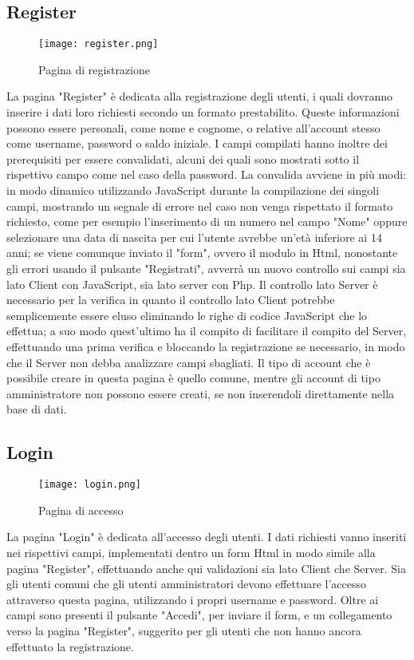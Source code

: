 \documentclass[binding=0.6cm, oneside, noexaminfo, italian]{sapthesis}
\begin{document}
\subsection{Register}
\begin{figure}[h]
    \centering
    \texttt{[image: register.png]}
    \caption{Pagina di registrazione}
    \label{fig:register}
\end{figure}
La pagina "Register" è dedicata alla registrazione degli utenti, i quali dovranno inserire i dati loro richiesti secondo un formato prestabilito. Queste informazioni possono essere personali, come nome e cognome, o relative all'account stesso come username, password o saldo iniziale. I campi compilati hanno inoltre dei prerequisiti per essere convalidati, alcuni dei quali sono mostrati sotto il rispettivo campo come nel caso della password. La convalida avviene in più modi: in modo dinamico utilizzando JavaScript durante la compilazione dei singoli campi, mostrando un segnale di errore nel caso non venga rispettato il formato richiesto, come per esempio l'inserimento di un numero nel campo "Nome" oppure selezionare una data di nascita per cui l'utente avrebbe un'età inferiore ai 14 anni; se viene comunque inviato il "form", ovvero il modulo in Html, nonostante gli errori usando il pulsante "Registrati", avverrà un nuovo controllo sui campi sia lato Client con JavaScript, sia lato server con Php. Il controllo lato Server è necessario per la verifica in quanto il controllo lato Client potrebbe semplicemente essere eluso eliminando le righe di codice JavaScript che lo effettua; a suo modo quest'ultimo ha il compito di facilitare il compito del Server, effettuando una prima verifica e bloccando la registrazione se necessario, in modo che il Server non debba analizzare campi sbagliati. Il tipo di account che è possibile creare in questa pagina è quello comune, mentre gli account di tipo amministratore non possono essere creati, se non inserendoli direttamente nella base di dati.
\subsection{Login}
\begin{figure}[h]
    \centering
    \texttt{[image: login.png]}
    \caption{Pagina di accesso}
    \label{fig:login}
\end{figure}
La pagina "Login" è dedicata all'accesso degli utenti. I dati richiesti vanno inseriti nei rispettivi campi, implementati dentro un form Html in modo simile alla pagina "Register", effettuando anche qui validazioni sia lato Client che Server. Sia gli utenti comuni che gli utenti amministratori devono effettuare l'accesso attraverso questa pagina, utilizzando i propri username e password. Oltre ai campi sono presenti il pulsante "Accedi", per inviare il form, e un collegamento verso la pagina "Register", suggerito per gli utenti che non hanno ancora effettuato la registrazione.
\end{document}
